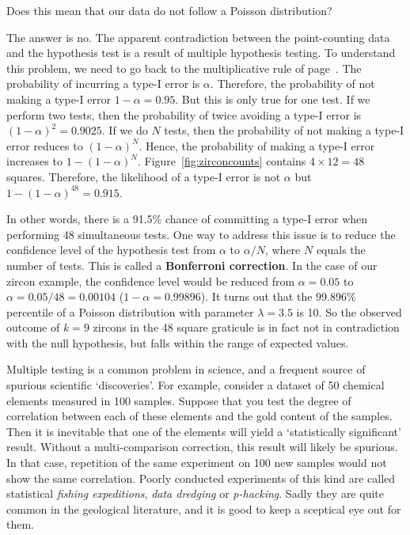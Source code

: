 Does this mean that our data do not follow a Poisson distribution?\medskip

The answer is no. The apparent contradiction between the
point-counting data and the hypothesis test is a result of multiple
hypothesis testing. To understand this problem, we need to go back to
the multiplicative rule of page~\pageref{page:multiplication}.  The
probability of incurring a type-I error is $\alpha$. Therefore, the
probability of not making a type-I error $1-\alpha=0.95$.  But this is
only true for one test. If we perform two tests, then the probability
of twice avoiding a type-I error is $(1-\alpha)^2=0.9025$. If we do
$N$ tests, then the probability of not making a type-I error reduces
to $(1-\alpha)^N$. Hence, the probability of making a type-I error
increases to $1-(1-\alpha)^N$. Figure~\ref{fig:zirconcounts} contains
${4}\times{12}=48$ squares. Therefore, the likelihood of a type-I
error is not $\alpha$ but $1-(1-\alpha)^{48}=0.915$.\medskip

In other words, there is a 91.5\% chance of committing a type-I error
when performing 48 simultaneous tests. One way to address this issue
is to reduce the confidence level of the hypothesis test from $\alpha$
to $\alpha/N$, where $N$ equals the number of tests.  This is called a
\textbf{Bonferroni correction}. In the case of our zircon example, the
confidence level would be reduced from $\alpha=0.05$ to
$\alpha=0.05/48=0.00104$ ($1-\alpha=0.99896$).  It turns out that the
99.896\% percentile of a Poisson distribution with parameter
$\lambda=3.5$ is 10. So the observed outcome of $k=9$ zircons in the
48 square graticule is in fact not in contradiction with the null
hypothesis, but falls within the range of expected values.\medskip

Multiple testing is a common problem in science, and a frequent source
of spurious scientific `discoveries'. For example, consider a dataset
of 50 chemical elements measured in 100 samples. Suppose that you test
the degree of correlation between each of these elements and the gold
content of the samples. Then it is inevitable that one of the elements
will yield a `statistically significant' result. Without a
multi-comparison correction, this result will likely be spurious. In
that case, repetition of the same experiment on 100 new samples would
not show the same correlation. Poorly conducted experiments of this
kind are called statistical \emph{fishing expeditions}, \emph{data
  dredging} or \emph{p-hacking}. Sadly they are quite common in the
geological literature, and it is good to keep a sceptical eye out for
them.

